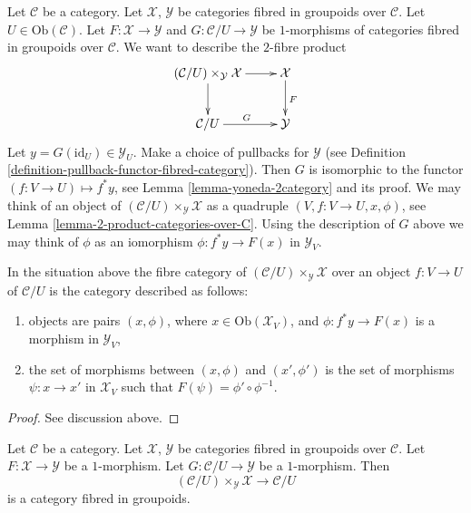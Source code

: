 \noindent
Let $\mathcal{C}$ be a category.
Let $\mathcal{X}$, $\mathcal{Y}$ be categories fibred in groupoids
over $\mathcal{C}$.
Let $U \in \text{Ob}(\mathcal{C})$.
Let $F : \mathcal{X} \to \mathcal{Y}$ and
$G : \mathcal{C}/U \to \mathcal{Y}$ be $1$-morphisms of categories
fibred in groupoids over $\mathcal{C}$.
We want to describe
the $2$-fibre product
$$
\xymatrix{
(\mathcal{C}/U) \times_{\mathcal{Y}} \mathcal{X} \ar[r] \ar[d] &
\mathcal{X} \ar[d]^F \\
\mathcal{C}/U \ar[r]^G &
\mathcal{Y}
}
$$
Let $y = G(\text{id}_U) \in \mathcal{Y}_U$.
Make a choice of pullbacks for $\mathcal{Y}$
(see Definition \ref{definition-pullback-functor-fibred-category}).
Then $G$ is isomorphic to the functor $(f : V \to U) \mapsto f^*y$,
see Lemma \ref{lemma-yoneda-2category} and its proof.
We may think of an object of
$(\mathcal{C}/U) \times_{\mathcal{Y}} \mathcal{X}$
as a quadruple $(V, f : V \to U, x, \phi)$, see
Lemma \ref{lemma-2-product-categories-over-C}.
Using the description of $G$ above we may think of $\phi$ as
an iomorphism $\phi : f^*y \to F(x)$ in $\mathcal{Y}_V$.

\begin{lemma}
\label{lemma-identify-fibre-product}
In the situation above the fibre category of
$(\mathcal{C}/U) \times_{\mathcal{Y}} \mathcal{X}$ over
an object $f : V \to U$ of $\mathcal{C}/U$
is the category described as follows:
\begin{enumerate}
\item objects are pairs $(x, \phi)$,
where $x \in \text{Ob}(\mathcal{X}_V)$, and
$\phi : f^*y \to F(x)$ is a morphism in $\mathcal{Y}_V$,
\item the set of morphisms between $(x, \phi)$ and $(x', \phi')$
is the set of morphisms $\psi : x \to x'$ in $\mathcal{X}_V$
such that $F(\psi) = \phi' \circ \phi^{-1}$.
\end{enumerate}
\end{lemma}

\begin{proof}
See discussion above.
\end{proof}

\begin{lemma}
\label{lemma-prepare-representable-map-stack-in-groupoids}
Let $\mathcal{C}$ be a category.
Let $\mathcal{X}$, $\mathcal{Y}$ be categories fibred in groupoids
over $\mathcal{C}$.
Let $F : \mathcal{X} \to \mathcal{Y}$ be a $1$-morphism.
Let $G : \mathcal{C}/U \to \mathcal{Y}$ be a $1$-morphism.
Then
$$
(\mathcal{C}/U) \times_{\mathcal{Y}} \mathcal{X}
\longrightarrow
\mathcal{C}/U
$$
is a category fibred in groupoids.
\end{lemma}

